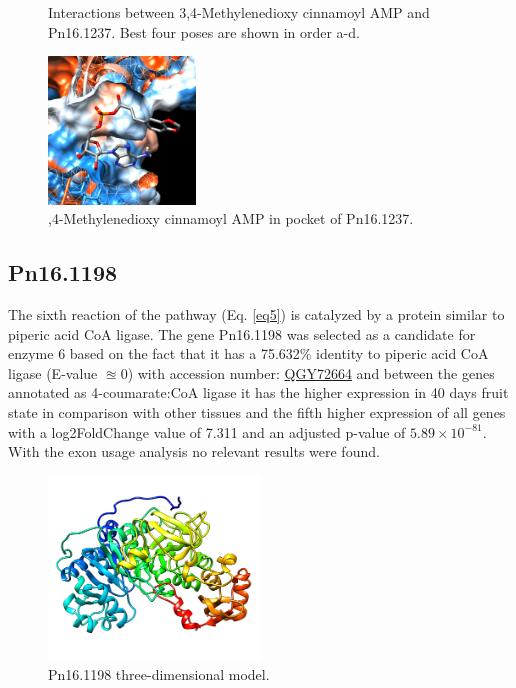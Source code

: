 \documentclass[12pt]{article}
\begin{document}
\begin{figure}[h!]
\begin{subfigure}[h!]{0.35\textwidth}
			\caption{}
		\end{subfigure}
		\hfill
		\caption[Interactions between 3,4-Methylenedioxy cinnamoyl AMP and Pn16.1237]{\centering Interactions between 3,4-Methylenedioxy cinnamoyl AMP and Pn16.1237. Best four poses are shown in order a-d.}
		\label{fig6k_4}
	\end{figure}
	\FloatBarrier
	
		
	\FloatBarrier
	\begin{figure}[h!]
		\centering
		\includegraphics[width=0.35\textwidth]{../6/known/Dock/chimera.png}
		\caption{,4-Methylenedioxy cinnamoyl AMP in pocket of Pn16.1237.}
		\label{fig6k_5}
	\end{figure}
	\FloatBarrier

	\subsection{Pn16.1198}
	
	The sixth reaction of the pathway (Eq. \ref{eq5}) is catalyzed by a protein similar to piperic acid CoA ligase. The gene Pn16.1198 was selected as a candidate for enzyme 6 based on the fact that it has a 75.632\% identity to piperic acid CoA ligase (E-value $\approxeq 0$) with accession number: \href{https://www.ncbi.nlm.nih.gov/protein/QGY72664.1/}{QGY72664} and between the genes annotated as 4-coumarate:CoA ligase it has the higher expression in 40 days fruit state in comparison with other tissues and the  fifth higher expression of all genes with a log2FoldChange value of 7.311 and an adjusted p-value of $5.89\times10^{-81}$.  With the exon usage analysis no relevant results were found.
	
	\FloatBarrier
	\begin{figure}
		\centering
		\includegraphics[width=0.5\textwidth]{../6/propose/Minimize/model2.png}
		\caption{\centering Pn16.1198 three-dimensional model.}
		\label{fig6p_1}
	\end{figure}
	\FloatBarrier
	
\end{document}
